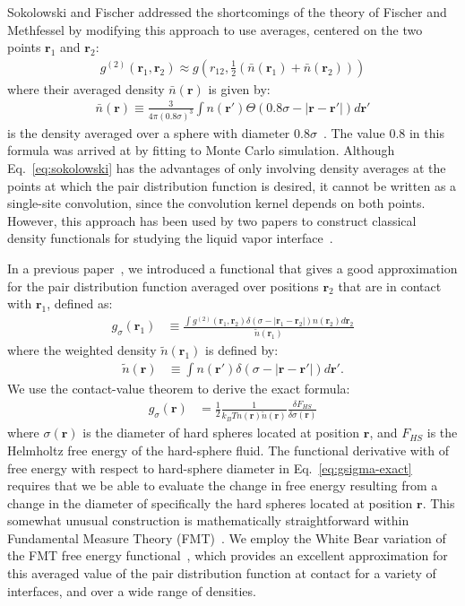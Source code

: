 \documentclass[letterpaper,twocolumn,amsmath,amssymb,pre,aps,10pt]{revtex4-1}
\newcommand{\rr}{\textbf{r}}
\begin{document}
Sokolowski and Fischer addressed the shortcomings of the theory of
Fischer and Methfessel by modifying this approach to use
averages, centered on the two points $\rr_1$ and $\rr_2$:
\begin{align}
  g^{(2)}(\rr_1,\rr_2) \approx g\left(r_{12},
  \tfrac12(\bar{n}(\rr_1)+\bar{n}(\rr_2))\right)
  \label{eq:sokolowski}
\end{align}
where their averaged density $\bar{n}(\rr)$ is given by:
\begin{align}
  \bar{n}(\rr) \equiv \frac{3}{4\pi (0.8\sigma)^3}\int n(\rr')\Theta(0.8\sigma - |\rr-\rr'|) d\rr'
\end{align}
is the density averaged over a sphere with diameter
$0.8\sigma$~\cite{sokolowski1992role}.  The value 0.8 in this formula
was arrived at by fitting to Monte Carlo simulation.  Although
Eq.~\ref{eq:sokolowski} has the advantages of only involving density
averages at the points at which the pair distribution function is
desired, it cannot be written as a single-site convolution, since the
convolution kernel depends on both points.  However, this approach has
been used by two papers to construct classical density functionals for
studying the liquid vapor interface~\cite{wadewitz2000application,
  winkelmann2001liquid}.

In a previous paper~\cite{schulte2012using}, we introduced a
functional that gives a good approximation for the pair distribution
function averaged over positions $\rr_2$ that are in contact with
$\rr_1$, defined as:
\begin{align}
  g_\sigma(\rr_1) &\equiv \frac{ \int g^{(2)}(\rr_1,\rr_2) \delta(\sigma -|\rr_1-\rr_2|)n(\rr_2)
    d\rr_2 }{ \tilde{n}(\rr_1)  }
\end{align}
where the weighted density $\tilde{n}(\rr_1)$ is defined by:
\begin{align}
  \tilde{n}(\rr) &\equiv \int n(\rr') \delta(\sigma -|\rr - \rr'|)d\rr'.
\end{align}
We use the contact-value theorem to derive the exact formula:
\begin{align}
  g_\sigma(\rr)%
  &= \frac12 \frac{1}{k_BT n(\rr) \tilde{n}(\rr)} \frac{\delta
    F_{HS}}{\delta \sigma(\mathbf{r})} \label{eq:gsigma-exact}
\end{align}
where $\sigma(\rr)$ is the diameter of hard spheres located at
position $\rr$, and $F_{HS}$ is the Helmholtz free energy of the
hard-sphere fluid.  The functional derivative with of free energy with
respect to hard-sphere diameter in Eq.~\ref{eq:gsigma-exact} requires
that we be able to evaluate the change in free energy resulting from a
change in the diameter of specifically the hard spheres located at
position $\rr$.  This somewhat unusual construction is mathematically
straightforward within Fundamental Measure Theory
(FMT)~\cite{rosenfeld1989free}.  We employ the White Bear variation of
the FMT free energy functional~\cite{roth2002whitebear}, which
provides an excellent approximation for this averaged value of the
pair distribution function at contact for a variety of interfaces, and
over a wide range of densities.
\end{document}
